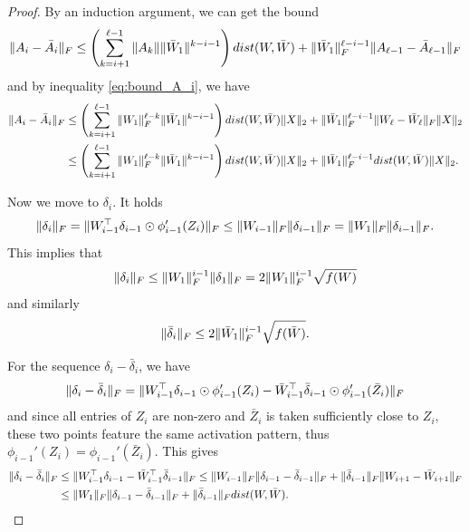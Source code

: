\documentclass[10pt,a4paper]{amsart}
\begin{document}
\begin{proof}
By an induction argument, we can get the bound
\begin{equation*}
    \|A_i-\bar A_i\|_{\rm F} \leq \left(\sum_{k=i+1}^{\ell-1} \|A_k\| \|\bar W_1\|^{k-i-1}\right) \textnormal{dist}(W,\bar W) + \|\bar W_1\|_{\rm F}^{\ell-i-1} \|A_{\ell-1}-\bar A_{\ell-1} \|_{\rm F}
\end{equation*}
and by inequality \eqref{eq:bound_A_i}, we have
\begin{align}
\label{eq:A_i-barA_i}
     \|A_i-\bar A_i\|_{\rm F} & \leq \nonumber \left(\sum_{k=i+1}^{\ell-1} \|W_1\|_{\rm F}^{\ell-k} \|\bar W_1\|^{k-i-1}\right) \textnormal{dist}(W,\bar W) \|X\|_2 + \|\bar W_1\|_{\rm F}^{\ell-i-1} \|W_{\ell}-\bar W_{\ell}\|_{\rm F} \|X\|_2 \\ & \leq \left(\sum_{k=i+1}^{\ell-1} \|W_1\|_{\rm F}^{\ell-k} \|\bar W_1\|^{k-i-1}\right) \textnormal{dist}(W,\bar W) \|X\|_2 + \|\bar W_1\|_{\rm F}^{\ell-i-1} \textnormal{dist}(W,\bar W) \|X\|_2.
\end{align}

Now we move to $\delta_i$. It holds
\begin{equation*}
    \|\delta_i\|_{\rm F} = \|W_{i-1}^\top \delta_{i-1} \odot \phi_{i-1}'(Z_i)\|_{\rm F} \leq \|W_{i-1}\|_{\rm F} \|\delta_{i-1}\|_{\rm F} = \|W_1\|_{\rm F} \|\delta_{i-1}\|_{\rm F}.
\end{equation*}
This implies that
\begin{equation*}
     \|\delta_i\|_{\rm F} \leq \|W_1\|_{\rm F}^{i-1} \|\delta_1\|_{\rm F} = 2 \|W_1\|_{\rm F}^{i-1} \sqrt{f(W)}
\end{equation*}
and similarly
\begin{equation}
\label{eq:bar_delta}
    \|\bar \delta_i\|_{\rm F} \leq 2 \|\bar W_1\|_{\rm F}^{i-1} \sqrt{f(\bar W)}.
\end{equation}

For the sequence $\delta_i-\bar \delta_i$, we have
\begin{align*}
    \|\delta_i - \bar \delta_i\|_{\rm F} = \| W_{i-1}^\top \delta_{i-1} \odot \phi_{i-1}'(Z_i) - \bar W_{i-1}^\top \bar \delta_{i-1} \odot \phi_{i-1}'(\bar Z_i)\|_{\rm F}
\end{align*}
and since all entries of $Z_i$ are non-zero and $\bar Z_i$ is taken sufficiently close to $Z_i$, these two points feature the same activation pattern, thus $\phi_{i-1}'(Z_i) = \phi_{i-1}'(\bar Z_i)$. This gives
\begin{align*}
    \|\delta_i - \bar \delta_i\|_{\rm F} & \leq \| W_{i-1}^\top \delta_{i-1} - \bar W_{i-1}^\top \bar \delta_{i-1}\|_{\rm F} \leq \|W_{i-1}\|_{\rm F} \| \delta_{i-1}-\bar \delta_{i-1}\|_{\rm F} + \|\bar \delta_{i-1}\|_{\rm F} \|W_{i+1}-\bar W_{i+1}\|_{\rm F} 
 \\ &\leq \|W_1\|_{\rm F} \| \delta_{i-1}-\bar \delta_{i-1}\|_{\rm F} + \|\bar \delta_{i-1}\|_{\rm F} \textnormal{dist}(W,\bar W).
\end{align*}


\end{proof}
\end{document}

